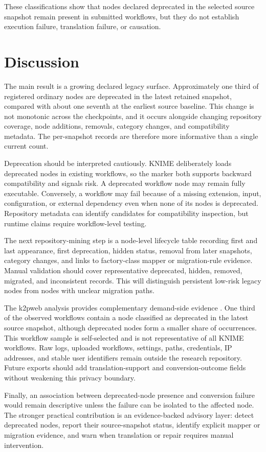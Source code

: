 \documentclass[runningheads]{llncs}
\begin{document}
These classifications show that nodes declared deprecated in the selected
source snapshot remain present in submitted workflows, but they do not
establish execution failure, translation failure, or causation.

\section{Discussion}

The main result is a growing declared legacy surface. Approximately one third
of registered ordinary nodes are deprecated in the latest retained snapshot,
compared with about one seventh at the earliest source baseline. This change is
not monotonic across the checkpoints, and it occurs alongside changing
repository coverage, node additions, removals, category changes, and compatibility
metadata. The per-snapshot records are therefore more informative than a single
current count.

Deprecation should be interpreted cautiously. KNIME deliberately loads
deprecated nodes in existing workflows, so the marker both supports backward
compatibility and signals risk. A deprecated workflow node may remain
fully executable. Conversely, a workflow may fail because of a missing
extension, input, configuration, or external dependency even when none of its
nodes is deprecated. Repository metadata can identify candidates for
compatibility inspection, but runtime claims require workflow-level testing.

The next repository-mining step is a node-level lifecycle table recording first
and last appearance, first deprecation, hidden status, removal from later
snapshots, category changes, and links to factory-class mapper or migration-rule
evidence. Manual validation should cover representative deprecated, hidden,
removed, migrated, and inconsistent records. This will distinguish persistent
low-risk legacy nodes from nodes with unclear migration paths.

The k2pweb analysis provides complementary demand-side evidence
\cite{KaplanKnime2py2026,K2PWeb2026}. One third of the observed workflows
contain a node classified as deprecated in the latest source snapshot, although
deprecated nodes form a smaller share of occurrences. This workflow sample is
self-selected and is not representative of all KNIME
workflows. Raw logs, uploaded workflows, settings, paths, credentials, IP
addresses, and stable user identifiers remain outside the research repository.
Future exports should add translation-support and conversion-outcome fields
without weakening this privacy boundary.

Finally, an association between deprecated-node presence and conversion failure
would remain descriptive unless the failure can be isolated to the affected
node. The stronger practical contribution is an evidence-backed advisory layer:
detect deprecated nodes, report their source-snapshot status, identify explicit
mapper or migration evidence, and warn when translation or repair requires
manual intervention.



\end{document}
